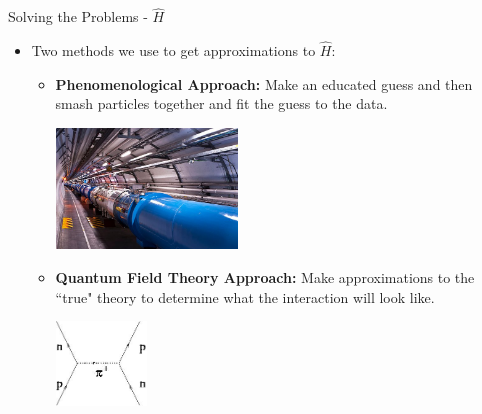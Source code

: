 \documentclass{beamer}
\begin{document}
\begin{frame}{Solving the Problems - $\hat{H}$}
\begin{itemize}
   \item Two methods we use to get approximations to $\hat{H}$:
   \begin{itemize}
      \item {\bf Phenomenological Approach:} Make an educated guess and then smash particles together and fit the guess to the data.
         \begin{center}
            \includegraphics[width=0.4\textwidth]{figures/lhc.jpg}
         \end{center}
      \item {\bf Quantum Field Theory Approach:} Make approximations to the ``true" theory to determine what the interaction will look like.
         \begin{center}
            \includegraphics[width=0.2\textwidth]{figures/pion_exchange.jpg}
         \end{center}
   \end{itemize}
\end{itemize}
\end{frame}
\end{document}
